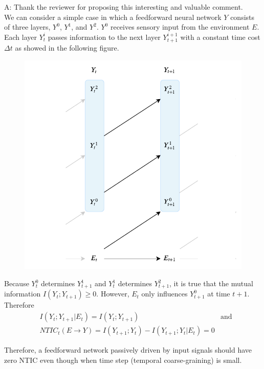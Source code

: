 \documentclass[utf8]{article}
\newenvironment{ans}  
    {\color{Black}\noindent A:}
    {~\newline}
\begin{document}
 		\begin{ans}
			Thank the reviewer for proposing this interesting and valuable comment. \\
			We can consider a simple case in which a feedforward neural network $Y$ consists of three layers, $Y^0$, $Y^1$, and $Y^2$. 
			$Y^0$ receives sensory input from the environment $E$. Each layer $Y^i_t$ passes information to the next layer $Y^{i+1}_{t+1}$ with a constant time cost $\Delta t$ as showed in the following figure.

 			\begin{figure}[H]
 				\centering
 				\includegraphics[width=\textwidth]{WritingMaterials/Fig_rev1_feedforward/Fig_rev1_feedforward} 				
 				\label{fig:rev1_feedforward}
 			\end{figure}
 			
			Because $Y^0_t$ determines $Y^1_{t+1}$ and $Y^1_t$ determines $Y^2_{t+1}$, it is true that the mutual information $I(Y_t; Y_{t+1}) \geq 0$. However, $E_t$ only influences $Y^0_{t+1}$ at time $t+1$. Therefore
			\begin{equation*}
				\begin{aligned}
					& I(Y_t; Y_{t+1}|E_t) = I(Y_t; Y_{t+1}) & \text{and} \\
					& NTIC_t(E\rightarrow Y)=I(Y_{t+1};Y_{t})-I(Y_{t+1};Y_{t}|E_{t}) =0  { }
				\end{aligned}
			\end{equation*}	
			
			Therefore, a feedforward network passively driven by input signals should have zero NTIC even though when time step (temporal coarse-graining) is small. 
			 		
 		\end{ans}
 	
\end{document}

